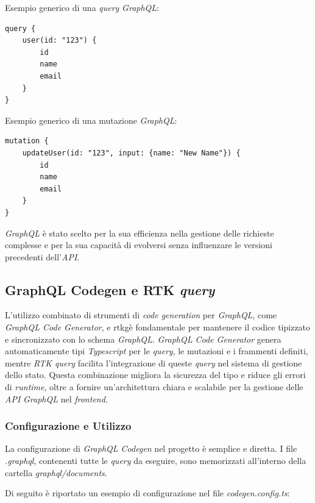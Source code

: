 Esempio generico di una \textit{query} \textit{GraphQL}:
\begin{verbatim}
query {
    user(id: "123") {
        id
        name
        email
    }
}
\end{verbatim}

Esempio generico di una mutazione \textit{GraphQL}:
\begin{verbatim}
mutation {
    updateUser(id: "123", input: {name: "New Name"}) {
        id
        name
        email
    }
}
\end{verbatim}

\textit{GraphQL} è stato scelto per la sua efficienza nella gestione delle richieste complesse e per la sua capacità di evolversi senza influenzare le versioni precedenti dell'\textit{API}.

\subsection{GraphQL Codegen e RTK \textit{query}}
\label{subsec:graphql_codegen}

L'utilizzo combinato di strumenti di \textit{code generation} per \textit{GraphQL}, come \textit{GraphQL Code Generator}, e \gls{rtkg}\glox è fondamentale per mantenere il codice tipizzato e sincronizzato con lo schema \textit{GraphQL}.
\textit{GraphQL Code Generator} genera automaticamente tipi \textit{Typescript} per le \textit{query}, le mutazioni e i frammenti definiti, mentre \textit{RTK query} facilita l'integrazione di queste \textit{query} nel sistema di gestione dello stato.
Questa combinazione migliora la sicurezza del tipo e riduce gli errori di \textit{runtime}, oltre a fornire un'architettura chiara e scalabile per la gestione delle \textit{API} \textit{GraphQL} nel \textit{frontend}.

\subsubsection{Configurazione e Utilizzo}
La configurazione di \textit{GraphQL Codegen} nel progetto è semplice e diretta. I file \textit{.graphql}, contenenti tutte le \textit{query} da eseguire, sono memorizzati all'interno della cartella \textit{graphql/documents}.

Di seguito è riportato un esempio di configurazione nel file \textit{codegen.config.ts}:

